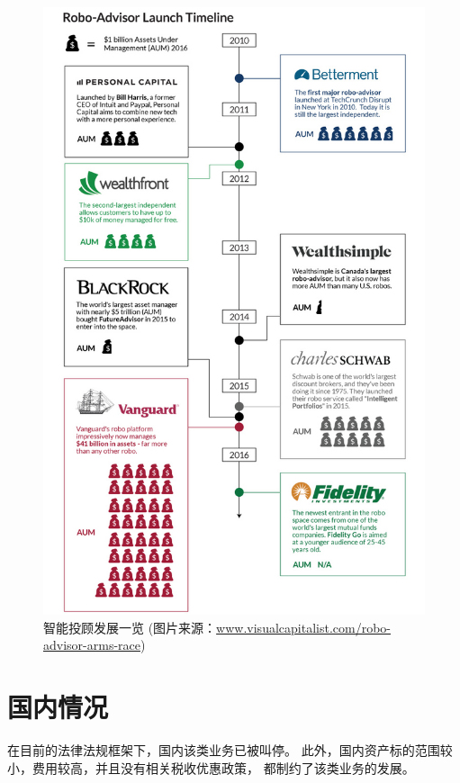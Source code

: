 \documentclass[a4paper, 11pt, UTF8]{report}
\begin{document}
\begin{figure}[htbp!]
        \centering
        \includegraphics[height=0.9\textheight]{advisor}
        \caption{智能投顾发展一览\newline 
                (图片来源：\underline{www.visualcapitalist.com/robo-advisor-arms-race})}
        \label{fig:adviosr}
\end{figure}


\section{国内情况}

在目前的法律法规框架下，国内该类业务已被叫停。
此外，国内资产标的范围较小，费用较高，并且没有相关税收优惠政策，
都制约了该类业务的发展。
\end{document}

